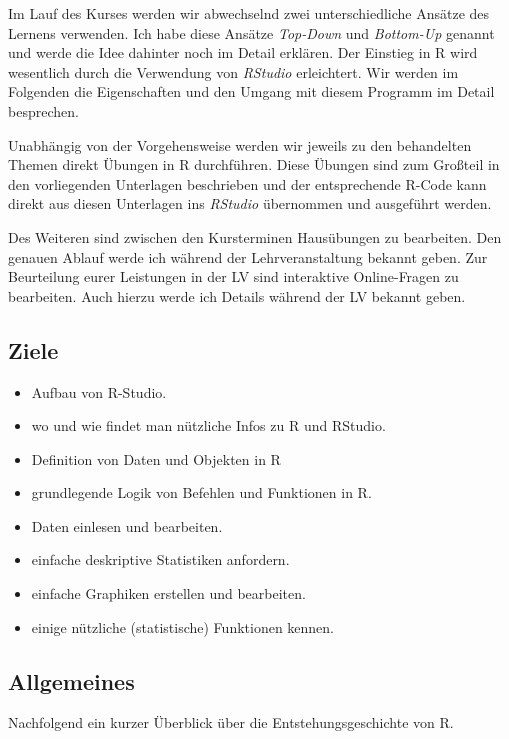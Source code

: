 \documentclass[]{article}
\providecommand{\tightlist}{%
  \setlength{\itemsep}{0pt}\setlength{\parskip}{0pt}}
\begin{document}
Im Lauf des Kurses werden wir abwechselnd zwei unterschiedliche Ansätze
des Lernens verwenden. Ich habe diese Ansätze \emph{Top-Down} und
\emph{Bottom-Up} genannt und werde die Idee dahinter noch im Detail
erklären. Der Einstieg in R wird wesentlich durch die Verwendung von
\emph{RStudio} erleichtert. Wir werden im Folgenden die Eigenschaften
und den Umgang mit diesem Programm im Detail besprechen.

Unabhängig von der Vorgehensweise werden wir jeweils zu den behandelten
Themen direkt Übungen in R durchführen. Diese Übungen sind zum Großteil
in den vorliegenden Unterlagen beschrieben und der entsprechende R-Code
kann direkt aus diesen Unterlagen ins \emph{RStudio} übernommen und
ausgeführt werden.

Des Weiteren sind zwischen den Kursterminen Hausübungen zu bearbeiten.
Den genauen Ablauf werde ich während der Lehrveranstaltung bekannt
geben. Zur Beurteilung eurer Leistungen in der LV sind interaktive
Online-Fragen zu bearbeiten. Auch hierzu werde ich Details während der
LV bekannt geben.

\subsection*{Ziele}\label{ziele}

\begin{itemize}
\tightlist
\item
  Aufbau von R-Studio.
\item
  wo und wie findet man nützliche Infos zu R und RStudio.
\item
  Definition von Daten und Objekten in R
\item
  grundlegende Logik von Befehlen und Funktionen in R.
\item
  Daten einlesen und bearbeiten.
\item
  einfache deskriptive Statistiken anfordern.
\item
  einfache Graphiken erstellen und bearbeiten.
\item
  einige nützliche (statistische) Funktionen kennen.
\end{itemize}

\subsection*{Allgemeines}\label{allgemeines}

Nachfolgend ein kurzer Überblick über die Entstehungsgeschichte von R.
\end{document}
